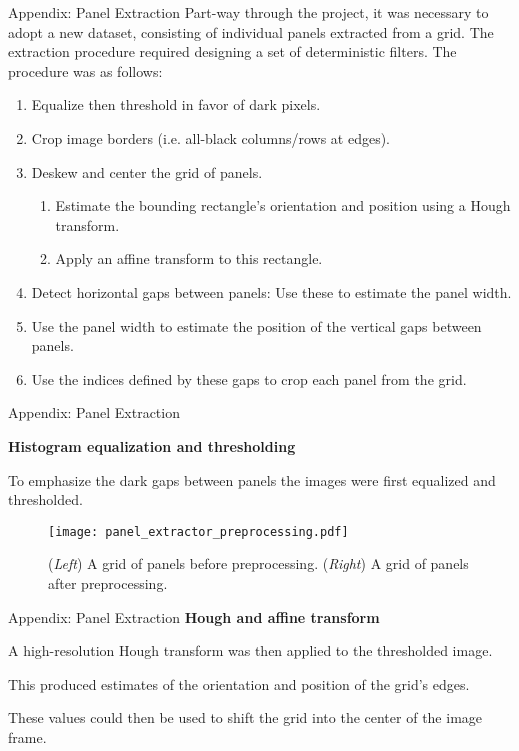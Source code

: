\documentclass[10pt]{beamer}
\begin{document}
\begin{frame}{Appendix: Panel Extraction}
	Part-way through the project, it was necessary to adopt a new dataset, consisting of individual panels extracted from a grid. The extraction procedure required designing a set of deterministic filters. The procedure was as follows:
	\begin{enumerate}
	\item Equalize then threshold in favor of dark pixels.
    	\item Crop image borders (i.e. all-black columns/rows at edges).
    	\item Deskew and center the grid of panels.
    		\begin{enumerate}
    			\item Estimate the bounding rectangle's orientation and position using a Hough transform.
    			\item Apply an affine transform to this rectangle.
    		\end{enumerate}
    	\item Detect horizontal gaps between panels: Use these to estimate the panel width.
    	\item Use the panel width to estimate the position of the vertical gaps between panels.
    	\item Use the indices defined by these gaps to crop each panel from the grid.
	\end{enumerate}
\end{frame}

\begin{frame}{Appendix: Panel Extraction}

	\textbf{Histogram equalization and thresholding}
	
	To emphasize the dark gaps between panels the images were first equalized and thresholded.
	\begin{figure}[b]
		\texttt{[image: panel\_extractor\_preprocessing.pdf]}
		\caption{(\emph{Left}) A grid of panels before preprocessing. (\emph{Right}) A grid of panels after preprocessing.}
	\end{figure}
\end{frame}

\begin{frame}{Appendix: Panel Extraction}
	\textbf{Hough and affine transform}
	
	A high-resolution Hough transform was then applied to the thresholded image.
	
	 This produced estimates of the orientation and position of the grid's edges. 
	 
	 These values could then be used to shift the grid into the center of the image frame.
\end{frame}
\end{document}
